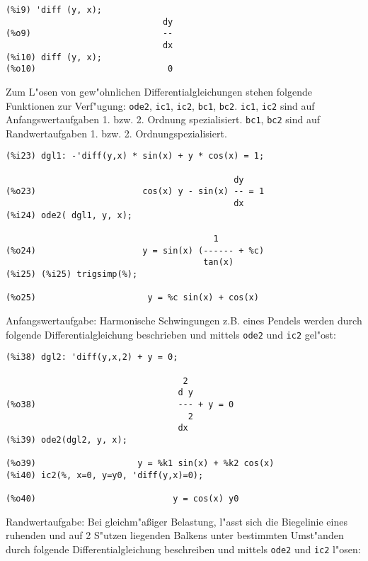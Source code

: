\documentclass[spanish,12pt,a4paper]{article}
\begin{document}
\scriptsize
\begin{verbatim}
(%i9) 'diff (y, x);
                               dy
(%o9)                          --
                               dx
(%i10) diff (y, x);
(%o10)                          0
\end{verbatim}
\normalsize

Zum L"osen von gew"ohnlichen Differentialgleichungen stehen folgende Funktionen zur Verf"ugung: \verb|ode2|, \verb|ic1|, \verb|ic2|, \verb|bc1|, \verb|bc2|.
\verb|ic1|, \verb|ic2| sind auf Anfangswertaufgaben 1. bzw. 2. Ordnung spezialisiert.
\verb|bc1|, \verb|bc2| sind auf Randwertaufgaben 1. bzw. 2. Ordnungspezialisiert.

\scriptsize
\begin{verbatim}
(%i23) dgl1: -'diff(y,x) * sin(x) + y * cos(x) = 1;

                                             dy
(%o23)                     cos(x) y - sin(x) -- = 1
                                             dx
(%i24) ode2( dgl1, y, x);

                                         1
(%o24)                     y = sin(x) (------ + %c)
                                       tan(x)
(%i25) (%i25) trigsimp(%);

(%o25)                      y = %c sin(x) + cos(x)
\end{verbatim}
\normalsize

Anfangswertaufgabe: Harmonische Schwingungen z.B. eines Pendels werden durch folgende Differentialgleichung beschrieben und mittels \verb|ode2| und \verb|ic2| gel"ost:

\scriptsize
\begin{verbatim}
(%i38) dgl2: 'diff(y,x,2) + y = 0;

                                   2
                                  d y
(%o38)                            --- + y = 0
                                    2
                                  dx
(%i39) ode2(dgl2, y, x);

(%o39)                    y = %k1 sin(x) + %k2 cos(x)
(%i40) ic2(%, x=0, y=y0, 'diff(y,x)=0);

(%o40)                           y = cos(x) y0
\end{verbatim}
\normalsize

Randwertaufgabe: Bei gleichm"aßiger Belastung, l"asst sich die Biegelinie eines ruhenden und auf 2 S"utzen liegenden Balkens unter bestimmten Umst"anden durch folgende Differentialgleichung beschreiben und mittels \verb|ode2| und \verb|ic2| l"osen:
\end{document}
